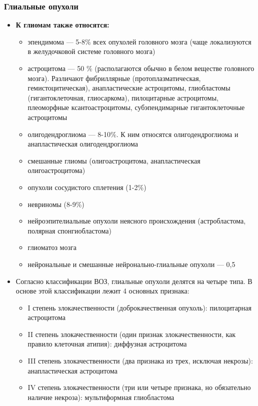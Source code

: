 \begin{frame}
  \frametitle{Глиальные опухоли}  
\begin{itemize}
  
  \item \textbf{К глиомам также относятся:}
  \begin{itemize}
    \item эпендимома — 5-8\% всех опухолей головного мозга (чаще локализуются в желудочковой системе головного мозга)
  \item астроцитома — 50 \% (располагаются обычно в белом веществе головного мозга). Различают фибриллярные (протоплазматическая, гемистоцитическая), анапластические астроцитомы, глиобластомы (гигантоклеточная, глиосаркома), пилоцитарные астроцитомы, плеоморфные ксантоастроцитомы, субэпендимарные гигантоклеточные астроцитомы
  \item олигодендроглиома — 8-10\%. К ним относятся олигодендроглиома и анапластическая олигодендроглиома
  \item смешанные глиомы (олигоастроцитома, анапластическая олигоастроцитома)
  \item опухоли сосудистого сплетения (1-2\%)
  \item невриномы (8-9\%)
  \item нейроэпителиальные опухоли неясного происхождения (астробластома, полярная спонгиобластома)
  \item глиоматоз мозга
  \item нейрональные и смешанные нейронально-глиальные опухоли — 0,5%
   \end{itemize}
  \item
  Согласно классификации ВОЗ, глиальные опухоли делятся на четыре типа. В основе этой классификации лежит 4 основных признака:
    \begin{itemize}
      \item I степень злокачественности (доброкачественная опухоль): пилоцитарная астроцитома
      \item II степень злокачественности (один признак злокачественности, как правило клеточная атипия): диффузная астроцитома 
      \item III степень злокачественности (два признака из трех, исключая некрозы): анапластическая астроцитома
      \item IV степень злокачественности (три или четыре признака, но обязательно наличие некроза): мультиформная глиобластома
    \end{itemize}
         
  \end{itemize}
  \end{frame}



